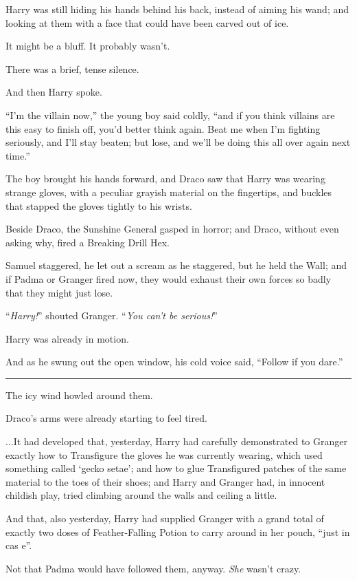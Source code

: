 Harry was still hiding his hands behind his back, instead of aiming his wand; and looking at them with a face that could have been carved out of ice.

It might be a bluff. It probably wasn't.

There was a brief, tense silence.

And then Harry spoke.

``I'm the villain now,'' the young boy said coldly, ``and if you think villains are this easy to finish off, you'd better think again. Beat me when I'm fighting seriously, and I'll stay beaten; but lose, and we'll be doing this all over again next time.''

The boy brought his hands forward, and Draco saw that Harry was wearing strange gloves, with a peculiar grayish material on the fingertips, and buckles that stapped the gloves tightly to his wrists.

Beside Draco, the Sunshine General gasped in horror; and Draco, without even asking why, fired a Breaking Drill Hex.

Samuel staggered, he let out a scream as he staggered, but he held the Wall; and if Padma or Granger fired now, they would exhaust their own forces so badly that they might just lose.

``\emph{Harry!}'' shouted Granger. ``\emph{You can't be serious!}''

Harry was already in motion.

And as he swung out the open window, his cold voice said, ``Follow if you dare.''

\begin{center}\rule{3in}{0.4pt}\end{center}

The icy wind howled around them.

Draco's arms were already starting to feel tired.

...It had developed that, yesterday, Harry had carefully demonstrated to Granger exactly how to Transfigure the gloves he was currently wearing, which used something called `gecko setae'; and how to glue Transfigured patches of the same material to the toes of their shoes; and Harry and Granger had, in innocent childish play, tried climbing around the walls and ceiling a little.

And that, also yesterday, Harry had supplied Granger with a grand total of exactly two doses of Feather-Falling Potion to carry around in her pouch, ``just in cas e''.

Not that Padma would have followed them, anyway. \emph{She} wasn't crazy.

